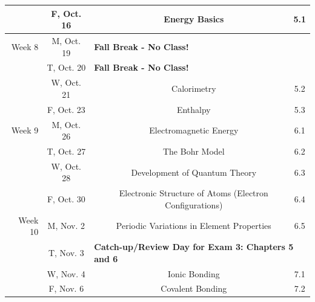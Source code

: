 \documentclass[12pt, letterpaper]{article}
\begin{document}
\begin{tabular}{rcccc}
	        & F, Oct. 16 &                                                                               & Energy Basics                                           & 5.1     \\
	\midrule
	Week 8  & M, Oct. 19 & \multicolumn{3}{l}{\textbf{Fall Break - No Class!}}                                                                                               \\
	        & T, Oct. 20 & \multicolumn{3}{l}{\textbf{Fall Break - No Class!}}                                                                                               \\
	        & W, Oct. 21 &                                                                               & Calorimetry                                             & 5.2     \\
	        & F, Oct. 23 &                                                                               & Enthalpy                                                & 5.3     \\
	\midrule
	Week 9  & M, Oct. 26 &                                                                               & Electromagnetic Energy                                  & 6.1     \\
	        & T, Oct. 27 &                                                                               & The Bohr Model                                          & 6.2     \\
	        & W, Oct. 28 &                                                                               & Development of Quantum Theory                           & 6.3     \\
	        & F, Oct. 30 &                                                                               & Electronic Structure of Atoms (Electron Configurations) & 6.4     \\
	\midrule
	Week 10 & M, Nov. 2  &                                                                               & Periodic Variations in Element Properties               & 6.5     \\
	        & T, Nov. 3  & \multicolumn{3}{l}{\textbf{Catch-up/Review Day for Exam 3: Chapters 5 and 6}}                                                                     \\
	        & W, Nov. 4  &                                                                               & Ionic Bonding                                           & 7.1     \\
	        & F, Nov. 6  &                                                                               & Covalent Bonding                                        & 7.2     \\
\end{tabular}
\end{document}
